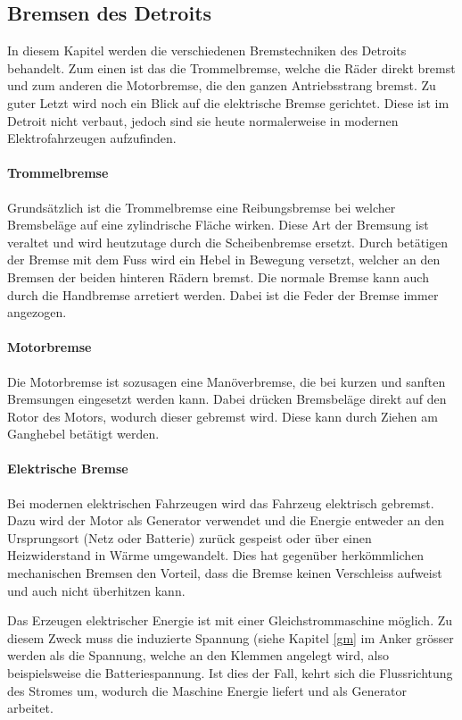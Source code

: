 \subsection{Bremsen des Detroits}\label{bremse}

In diesem Kapitel werden die verschiedenen Bremstechniken des Detroits behandelt. Zum einen ist das die Trommelbremse, welche die Räder direkt bremst und zum anderen die Motorbremse, die den ganzen Antriebsstrang bremst. Zu guter Letzt wird noch ein Blick auf die elektrische Bremse gerichtet. Diese ist im Detroit nicht verbaut, jedoch sind sie heute normalerweise in modernen Elektrofahrzeugen aufzufinden.

\paragraph{Trommelbremse}

Grundsätzlich ist die Trommelbremse eine Reibungsbremse bei welcher Bremsbeläge auf eine zylindrische Fläche wirken. Diese Art der Bremsung ist veraltet und wird heutzutage durch die Scheibenbremse ersetzt. Durch betätigen der Bremse mit dem Fuss wird ein Hebel in Bewegung versetzt, welcher an den Bremsen der beiden hinteren Rädern bremst. Die normale Bremse kann auch durch die Handbremse arretiert werden. Dabei ist die Feder der Bremse immer angezogen.

\paragraph{Motorbremse}

Die Motorbremse ist sozusagen eine Manöverbremse, die bei kurzen und sanften Bremsungen eingesetzt werden kann. Dabei drücken Bremsbeläge direkt auf den Rotor des Motors, wodurch dieser gebremst wird. Diese kann durch Ziehen am Ganghebel betätigt werden.

\paragraph{Elektrische Bremse}
Bei modernen elektrischen Fahrzeugen wird das Fahrzeug elektrisch gebremst. Dazu wird der Motor als Generator verwendet und die Energie entweder an den Ursprungsort (Netz oder Batterie) zurück gespeist oder über einen Heizwiderstand in Wärme umgewandelt. Dies hat gegenüber herkömmlichen mechanischen Bremsen den Vorteil, dass die Bremse keinen Verschleiss aufweist und auch nicht überhitzen kann.

Das Erzeugen elektrischer Energie ist mit einer Gleichstrommaschine möglich. Zu diesem Zweck muss die induzierte Spannung (siehe Kapitel \ref{gm} im Anker grösser werden als die Spannung, welche an den Klemmen angelegt wird, also beispielsweise die Batteriespannung. Ist dies der Fall, kehrt sich die Flussrichtung des Stromes um, wodurch die Maschine Energie liefert und als Generator arbeitet.


